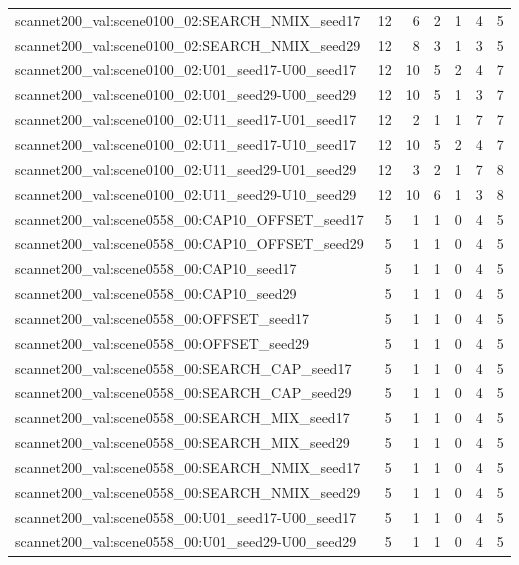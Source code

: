 \begin{table}[t]
\begin{tabular}{lrrrrrr}
scannet200\_val:scene0100\_02:SEARCH\_NMIX\_seed17 & 12 & 6 & 2 & 1 & 4 & 5 \\
scannet200\_val:scene0100\_02:SEARCH\_NMIX\_seed29 & 12 & 8 & 3 & 1 & 3 & 5 \\
scannet200\_val:scene0100\_02:U01\_seed17-U00\_seed17 & 12 & 10 & 5 & 2 & 4 & 7 \\
scannet200\_val:scene0100\_02:U01\_seed29-U00\_seed29 & 12 & 10 & 5 & 1 & 3 & 7 \\
scannet200\_val:scene0100\_02:U11\_seed17-U01\_seed17 & 12 & 2 & 1 & 1 & 7 & 7 \\
scannet200\_val:scene0100\_02:U11\_seed17-U10\_seed17 & 12 & 10 & 5 & 2 & 4 & 7 \\
scannet200\_val:scene0100\_02:U11\_seed29-U01\_seed29 & 12 & 3 & 2 & 1 & 7 & 8 \\
scannet200\_val:scene0100\_02:U11\_seed29-U10\_seed29 & 12 & 10 & 6 & 1 & 3 & 8 \\
scannet200\_val:scene0558\_00:CAP10\_OFFSET\_seed17 & 5 & 1 & 1 & 0 & 4 & 5 \\
scannet200\_val:scene0558\_00:CAP10\_OFFSET\_seed29 & 5 & 1 & 1 & 0 & 4 & 5 \\
scannet200\_val:scene0558\_00:CAP10\_seed17 & 5 & 1 & 1 & 0 & 4 & 5 \\
scannet200\_val:scene0558\_00:CAP10\_seed29 & 5 & 1 & 1 & 0 & 4 & 5 \\
scannet200\_val:scene0558\_00:OFFSET\_seed17 & 5 & 1 & 1 & 0 & 4 & 5 \\
scannet200\_val:scene0558\_00:OFFSET\_seed29 & 5 & 1 & 1 & 0 & 4 & 5 \\
scannet200\_val:scene0558\_00:SEARCH\_CAP\_seed17 & 5 & 1 & 1 & 0 & 4 & 5 \\
scannet200\_val:scene0558\_00:SEARCH\_CAP\_seed29 & 5 & 1 & 1 & 0 & 4 & 5 \\
scannet200\_val:scene0558\_00:SEARCH\_MIX\_seed17 & 5 & 1 & 1 & 0 & 4 & 5 \\
scannet200\_val:scene0558\_00:SEARCH\_MIX\_seed29 & 5 & 1 & 1 & 0 & 4 & 5 \\
scannet200\_val:scene0558\_00:SEARCH\_NMIX\_seed17 & 5 & 1 & 1 & 0 & 4 & 5 \\
scannet200\_val:scene0558\_00:SEARCH\_NMIX\_seed29 & 5 & 1 & 1 & 0 & 4 & 5 \\
scannet200\_val:scene0558\_00:U01\_seed17-U00\_seed17 & 5 & 1 & 1 & 0 & 4 & 5 \\
scannet200\_val:scene0558\_00:U01\_seed29-U00\_seed29 & 5 & 1 & 1 & 0 & 4 & 5 \\

\end{tabular}
\end{table}
